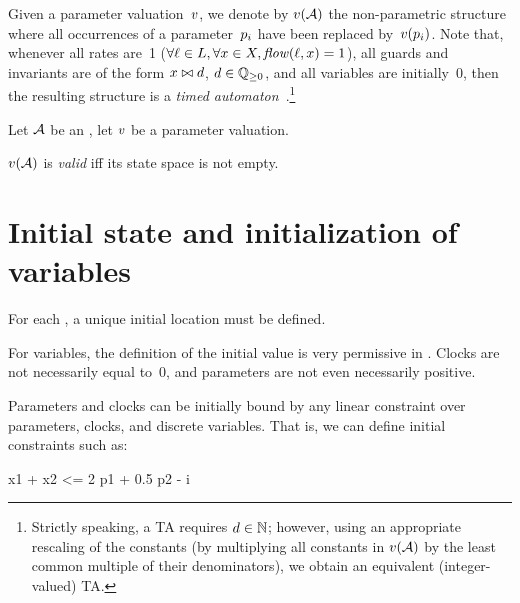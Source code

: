 Given a parameter valuation~$v$, we denote by $v(\mathcal{A})$ the non-parametric structure where all occurrences of a parameter~$p_i$ have been replaced by~$v(p_i)$.
Note that, whenever
	all rates are~1 ($\forall \ell \in L, \forall x \in X, \mathit{flow}(\ell, x) = 1$),
	all guards and invariants are of the form $x \bowtie d$, $d \in \mathbb Q_{\geq 0}$,
	and
	all variables are initially~0, %
then
the resulting structure is a \emph{timed automaton}~\cite{AD94}.\footnote{%
	Strictly speaking, a TA requires $d \in \mathbb N$; however, using an appropriate rescaling of the constants (by multiplying all constants in $v(\mathcal{A})$ by the least common multiple of their denominators), we obtain an equivalent (integer-valued) TA.
}

\begin{definition}[validity]\label{definition:validity}
	Let $\mathcal{A}$ be an \NIPTA{}, let $v$ be a parameter valuation.

	$v(\mathcal{A})$ is \emph{valid} iff its state space is not empty.
\end{definition}



\section{Initial state and initialization of variables}\label{section:init}

For each \IPTA{}, a unique initial location must be defined.

For variables, the definition of the initial value is very permissive in \imitator{}.
Clocks are not necessarily equal to~0, and parameters are not even necessarily positive.

Parameters and clocks can be initially bound by any linear constraint over parameters, clocks, and discrete variables.
That is, we can define initial constraints such as:

\begin{IMITATORmodel}
x1 + x2 <= 2 p1 + 0.5 p2 - i
\end{IMITATORmodel}

